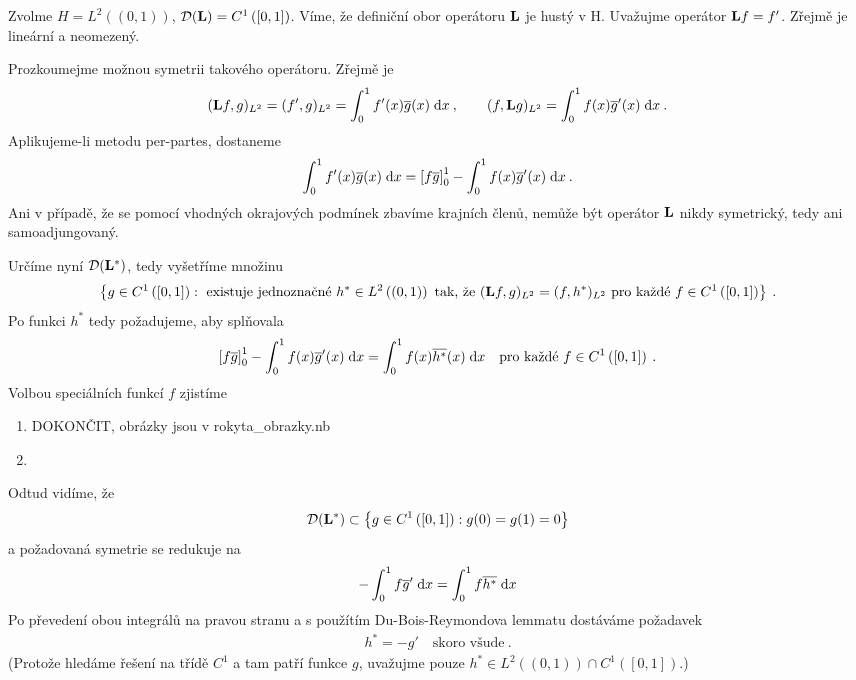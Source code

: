 \begin{example}
Zvolme $H = L^2\left( (0,1) \right)$, $\mathcal{D}(\mathbf{L}) = C^1 \left( [0,1] \right)$. Víme, že definiční obor operátoru $\mathbf{L}$ je hustý v H. Uvažujme operátor $\mathbf{L} f = f'$. Zřejmě je lineární a neomezený.

Prozkoumejme možnou symetrii takového operátoru. Zřejmě je \begin{align*}
    (\mathbf{L} f,g)_{L^2} =(f',g)_{L^2} = \int_0^1 f'(x) \overline{g}(x) \;\mathrm{d}x \:, \qquad (f,\mathbf{L} g)_{L^2} = \int_0^1 f(x) \overline{g}'(x) \;\mathrm{d}x \:. 
\end{align*}
Aplikujeme-li metodu per-partes, dostaneme \begin{align*}
    \int_0^1 f'(x) \overline{g}(x) \;\mathrm{d}x = \left[ f \overline {g} \right]_0^1 - \int_0^1 f(x) \overline{g}'(x) \;\mathrm{d}x \:.
\end{align*}
Ani v případě, že se pomocí vhodných okrajových podmínek zbavíme krajních členů, nemůže být operátor $\mathbf{L}$ nikdy symetrický, tedy ani samoadjungovaný.

Určíme nyní $\mathcal{D}(\mathbf{L}^*)$, tedy vyšetříme množinu \begin{align*}
    \left \lbrace g \in C^1 \left( [0,1 ]\right) : \text{ existuje jednoznačné } h^* \in L^2\left( (0,1)\right) \text{ tak, že } (\mathbf{L} f,g)_{L^2}=(f, h^*)_{L^2} \text{ pro každé } f \in C^1 \left( [0,1 ]\right)  \right \rbrace \:.
\end{align*}
Po funkci $h^*$ tedy požadujeme, aby splňovala \begin{align*}
    \left[ f \overline {g} \right]_0^1 - \int_0^1 f(x) \overline{g}'(x) \;\mathrm{d}x = \int_0^1 f(x) \overline{h^*}(x) \;\mathrm{d}x \quad \text{pro každé } f \in C^1\left( [0,1 ]\right) \:.
\end{align*}
Volbou speciálních funkcí $f$ zjistíme \begin{enumerate}
    \item DOKONČIT, obrázky jsou v \textrm{rokyta\_obrazky.nb}
    \item
\end{enumerate}
Odtud vidíme, že \begin{align*}
    \mathcal{D}(\mathbf{L}^*) \subset \left \lbrace g \in C^1 \left( [0,1 ]\right) : g(0)=g(1)=0 \right \rbrace
\end{align*}
a požadovaná symetrie se redukuje na \begin{align*}
     -\int_0^1 f \overline{g}' \;\mathrm{d}x = \int_0^1 f \overline{h^*} \;\mathrm{d}x 
\end{align*}
Po převedení obou integrálů na pravou stranu a s použítím Du-Bois-Reymondova lemmatu dostáváme požadavek \begin{align*}
    h^* = -g' \quad \text{skoro všude} \:.
\end{align*}
(Protože hledáme řešení na třídě $C^1$ a tam patří funkce $g$, uvažujme pouze $h^* \in L^2\left( (0,1)\right) \cap C^1 \left(  [0,1] \right)$.)


\end{example}
